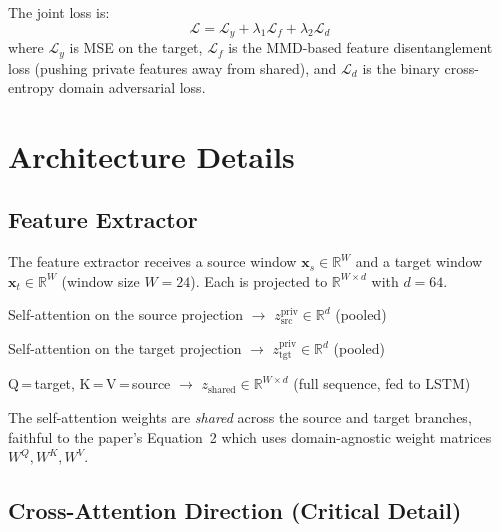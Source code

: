 \documentclass[12pt,a4paper]{article}
\begin{document}
The joint loss is:
\begin{equation}
    \mathcal{L} = \mathcal{L}_y + \lambda_1 \mathcal{L}_f + \lambda_2 \mathcal{L}_d
\end{equation}
where $\mathcal{L}_y$ is MSE on the target, $\mathcal{L}_f$ is the MMD-based
feature disentanglement loss (pushing private features away from shared), and
$\mathcal{L}_d$ is the binary cross-entropy domain adversarial loss.

\section{Architecture Details}

\subsection{Feature Extractor}

The feature extractor receives a source window $\mathbf{x}_s \in \mathbb{R}^W$
and a target window $\mathbf{x}_t \in \mathbb{R}^W$ (window size $W = 24$).
Each is projected to $\mathbb{R}^{W \times d}$ with $d = 64$.

\begin{description}[leftmargin=2em]
    \item[Source branch] Self-attention on the source projection $\rightarrow$
    $z_{\text{src}}^{\text{priv}} \in \mathbb{R}^d$ (pooled)
    \item[Target branch] Self-attention on the target projection $\rightarrow$
    $z_{\text{tgt}}^{\text{priv}} \in \mathbb{R}^d$ (pooled)
    \item[Cross-attention branch] Q\,=\,target, K\,=\,V\,=\,source $\rightarrow$
    $z_{\text{shared}} \in \mathbb{R}^{W \times d}$ (full sequence, fed to LSTM)
\end{description}

The self-attention weights are \emph{shared} across the source and target branches,
faithful to the paper's Equation~2 which uses domain-agnostic weight matrices
$W^Q, W^K, W^V$.

\subsection{Cross-Attention Direction (Critical Detail)}
\end{document}
